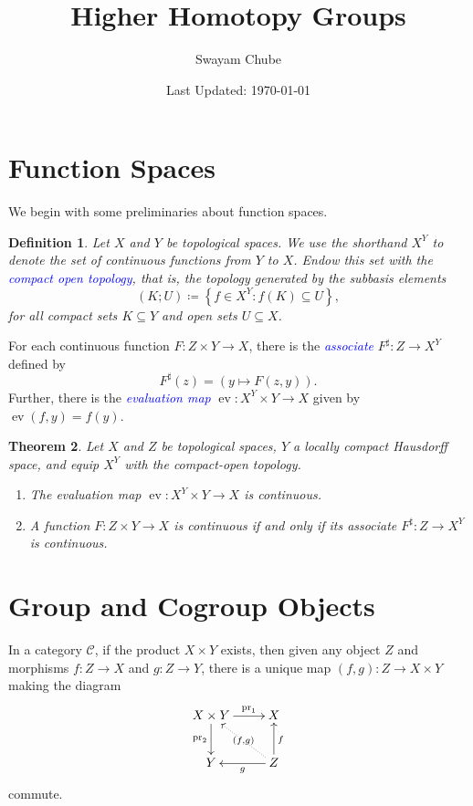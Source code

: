 \documentclass[11pt]{article}
\theoremstyle{thmstyle}
\newtheorem{theorem}{Theorem}
\theoremstyle{defstyle}
\newtheorem{definition}[theorem]{Definition}
\newcommand{\ev}{\operatorname{ev}}
\newcommand{\define}[1]{\textcolor{blue}{\textit{#1}}}
\newcommand{\scrC}{\mathscr{C}}
\newcommand{\pr}{\operatorname{pr}}
\begin{document}
\title{Higher Homotopy Groups}
\author{Swayam Chube}
\date{Last Updated: \today}
\maketitle

\section{Function Spaces}

We begin with some preliminaries about function spaces. 
\begin{definition}
	Let $X$ and $Y$ be topological spaces. We use the shorthand $X^Y$ to denote the set of continuous functions from $Y$ to $X$. Endow this set with the \define{compact open topology}, that is, the topology generated by the subbasis elements 
	\begin{equation*}
		(K; U)\coloneq \left\{f\in X^Y\colon f(K)\subseteq U\right\},
	\end{equation*}
	for all compact sets $K\subseteq Y$ and open sets $U\subseteq X$.
\end{definition}

For each continuous function $F\colon Z\times Y\to X$, there is the \define{associate}  $F^\sharp\colon Z\to X^Y$ defined by 
\begin{equation*}
	F^\sharp(z) = \left(y\longmapsto F(z, y)\right).
\end{equation*}
Further, there is the \define{evaluation map} $\ev\colon X^Y\times Y\to X$ given by $\ev(f, y) = f(y)$.

\begin{theorem}
	Let $X$ and $Z$ be topological spaces, $Y$ a locally compact Hausdorff space, and equip $X^Y$ with the compact-open topology.
	\begin{enumerate}[label=(\arabic*)]
		\item The evaluation map $\ev\colon X^Y\times Y\to X$ is continuous. 
		\item A function $F\colon Z\times Y\to X$ is continuous if and only if its associate $F^\sharp\colon Z\to X^Y$ is continuous.
	\end{enumerate}
\end{theorem}

\section{Group and Cogroup Objects}

In a category $\scrC$, if the product $X\times Y$ exists, then given any object $Z$ and morphisms $f\colon Z\to X$ and $g\colon Z\to Y$, there is a unique map $(f, g)\colon Z\to X\times Y$ making the diagram 
\begin{equation*}
	\xymatrix {
		X\times Y\ar[r]^-{\pr_1}\ar[d]_-{\pr_2} & X\\
		Y & Z\ar[l]^g\ar[u]_f\ar@{.>}[lu]|-{(f, g)}
	}
\end{equation*}
commute. 
\end{document}
